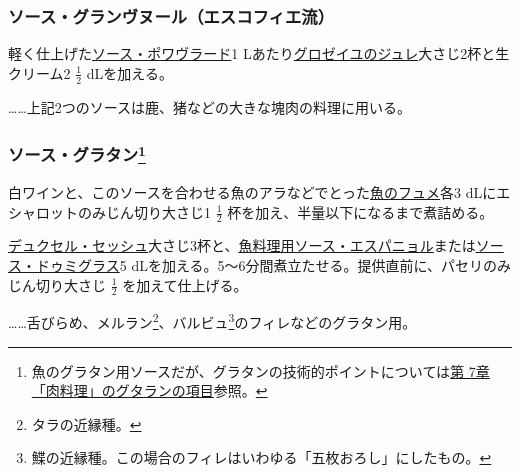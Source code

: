 \begin{recette}
\hypertarget{sauce-grand-veneur-procede-escoffier}{%
\subsubsection{ソース・グランヴヌール（エスコフィエ流）}\label{sauce-grand-veneur-procede-escoffier}}



軽く仕上げた\protect\hyperlink{sauce-poivrade}{ソース・ポワヴラード}1
Lあたり\protect\hyperlink{gelee-de-groseilles-a}{グロゼイユのジュレ}大さじ2杯と生クリーム2
\(\frac{1}{2}\) dLを加える。

\ldots{}\ldots{}上記2つのソースは鹿、猪などの大きな塊肉の料理に用いる。

\hypertarget{sauce-gratin}{%
\subsubsection[ソース・グラタン]{\texorpdfstring{ソース・グラタン\footnote{魚のグラタン用ソースだが、グラタンの技術的ポイントについては\protect\hyperlink{gratins}{第
  7章「肉料理」のグタランの項目}参照。}}{ソース・グラタン}}\label{sauce-gratin}}



白ワインと、このソースを合わせる魚のアラなどでとった\protect\hyperlink{fumet-de-poisson}{魚のフュメ}各3
dLにエシャロットのみじん切り大さじ1 \(\frac{1}{2}\)
杯を加え、半量以下になるまで煮詰める。

\protect\hyperlink{duxelles-seche}{デュクセル・セッシュ}大さじ3杯と、\protect\hyperlink{sauce-espagnole-maigre}{魚料理用ソース・エスパニョル}または\protect\hyperlink{sauce-demi-glace}{ソース・ドゥミグラス}5
dLを加える。5〜6分間煮立たせる。提供直前に、パセリのみじん切り大さじ
\(\frac{1}{2}\) を加えて仕上げる。

\ldots{}\ldots{}舌びらめ、メルラン\footnote{タラの近縁種。}、バルビュ\footnote{鰈の近縁種。この場合のフィレはいわゆる「五枚おろし」にしたもの。}のフィレなどのグラタン用。


\end{recette}
